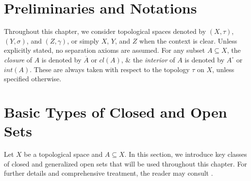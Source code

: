 \documentclass[12pt,a4paper,twoside]{report}  %
\theoremstyle{plain}
\theoremstyle{definition}
\begin{document}
\section{Preliminaries and Notations}

Throughout this chapter, we consider topological spaces denoted by \((X, \tau)\), \((Y, \sigma)\), and \((Z, \gamma)\), or simply \(X\), \(Y\), and \(Z\) when the context is clear. Unless explicitly stated, no separation axioms are assumed.
For any subset \(A \subseteq X\), the \emph{closure} of \(A\) is denoted by \(\overline{A}\) or \(cl(A)\), $\&$ the \emph{interior} of \(A\) is denoted by \(A^\circ\) or \(int(A)\). These are always taken with respect to the topology \(\tau\) on \(X\), unless specified otherwise.


\section{Basic Types of Closed and Open Sets}

Let \(X\) be a topological space and \(A \subseteq X\). In this section, we introduce key classes of closed and generalized open sets that will be used throughout this chapter. For further details and comprehensive treatment, the reader may consult \cite{andrijevic1996b, el1997study, hatir1996decomposition,levine1970gen, levine1963semi, Sundaram2000,malathi2017pre, mashhour1982precontinuous, me1983beta, njȧstad1965some, rodrigo2012international, stone1937applications}.
\end{document}
